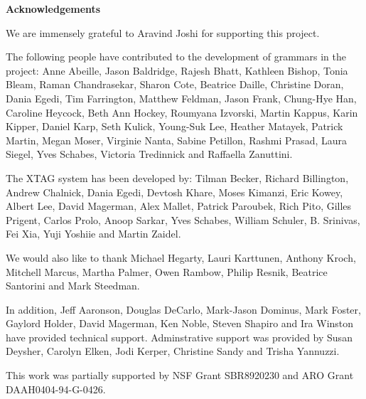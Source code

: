 \pagestyle{plain} 
\null\vfil 
\begin{center} 
{\bf Acknowledgements} 
\end{center} 
\setcounter{page}{0} 
 
We are immensely grateful to Aravind Joshi for supporting this 
project. 
 
The following people have contributed to the development of grammars in the 
project: Anne Abeille, Jason Baldridge, Rajesh Bhatt, Kathleen Bishop, Tonia 
Bleam, Raman Chandrasekar, Sharon Cote, Beatrice Daille, Christine Doran, Dania 
Egedi, Tim Farrington, Matthew Feldman, Jason Frank, Chung-Hye Han, Caroline 
Heycock, Beth Ann Hockey, Roumyana Izvorski, Martin Kappus, Karin Kipper, 
Daniel Karp, Seth Kulick, Young-Suk Lee, Heather Matayek, Patrick Martin, Megan 
Moser, Virginie Nanta, Sabine Petillon, Rashmi Prasad, Laura Siegel, Yves 
Schabes, Victoria Tredinnick and Raffaella Zanuttini. 
 
The XTAG system has been developed by: Tilman Becker, Richard Billington, 
Andrew Chalnick, Dania Egedi, Devtosh Khare, Moses Kimanzi, Eric Kowey, 
Albert Lee, David Magerman, Alex Mallet, Patrick Paroubek, Rich Pito, 
Gilles Prigent, Carlos Prolo, Anoop Sarkar, Yves Schabes, William Schuler, 
B. Srinivas, Fei Xia, Yuji Yoshiie and Martin Zaidel. 
 
We would also like to thank Michael Hegarty, Lauri Karttunen, Anthony 
Kroch, Mitchell Marcus, Martha Palmer, Owen Rambow, Philip Resnik, 
Beatrice Santorini and Mark Steedman. 
 
In addition, Jeff Aaronson, Douglas DeCarlo, Mark-Jason Dominus, Mark 
Foster, Gaylord Holder, David Magerman, Ken Noble, Steven Shapiro and 
Ira Winston have provided technical support.  Adminstrative support 
was provided by Susan Deysher, Carolyn Elken, Jodi Kerper, Christine 
Sandy and Trisha Yannuzzi. 
 
This work was partially supported by  NSF Grant SBR8920230 and ARO Grant 
DAAH0404-94-G-0426. 
 
\newpage 
 
